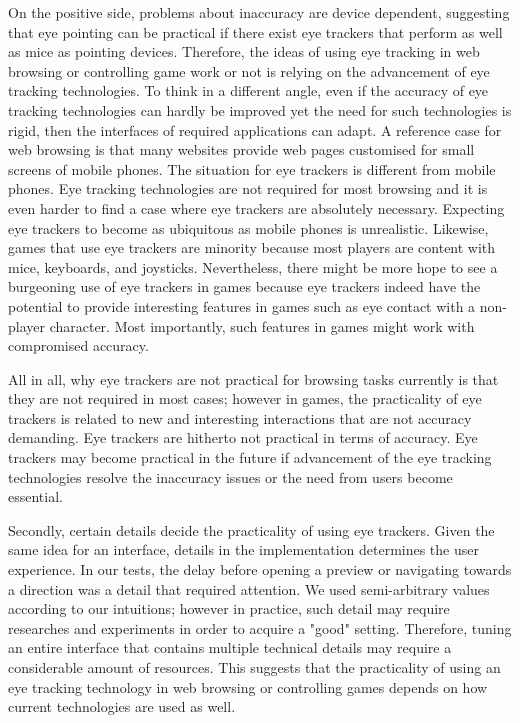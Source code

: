 \documentclass[english]{tktltiki}
\begin{document}
On the positive side, problems about inaccuracy are device dependent, suggesting that eye pointing can be practical if there exist eye trackers that perform as well as mice as pointing devices. Therefore, the ideas of using eye tracking in web browsing or controlling game work or not is relying on the advancement of eye tracking technologies. To think in a different angle, even if the accuracy of eye tracking technologies can hardly be improved yet the need for such technologies is rigid, then the interfaces of required applications can adapt. A reference case for web browsing is that many websites provide web pages customised for small screens of mobile phones. The situation for eye trackers is different from mobile phones. Eye tracking technologies are not required for most browsing and it is even harder to find a case where eye trackers are absolutely necessary. Expecting eye trackers to become as ubiquitous as mobile phones is unrealistic. Likewise, games that use eye trackers are minority because most players are content with mice, keyboards, and joysticks. Nevertheless, there might be more hope to see a burgeoning use of eye trackers in games because eye trackers indeed have the potential to provide interesting features in games such as eye contact with a non-player character. Most importantly, such features in games might work with compromised accuracy.

All in all, why eye trackers are not practical for browsing tasks currently is that they are not required in most cases; however in games, the practicality of eye trackers is related to new and interesting interactions that are not accuracy demanding. Eye trackers are hitherto not practical in terms of accuracy. Eye trackers may become practical in the future if advancement of the eye tracking technologies resolve the inaccuracy issues or the need from users become essential.

Secondly, certain details decide the practicality of using eye trackers. Given the same idea for an interface, details in the implementation determines the user experience. In our tests, the delay before opening a preview or navigating towards a direction was a detail that required attention. We used semi-arbitrary values according to our intuitions; however in practice, such detail may require researches and experiments in order to acquire a "good" setting. Therefore, tuning an entire interface that contains multiple technical details may require a considerable amount of resources. This suggests that the practicality of using an eye tracking technology in web browsing or controlling games depends on how current technologies are used as well.
\end{document}
